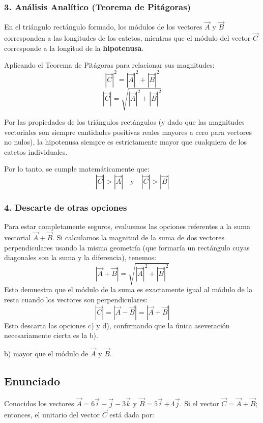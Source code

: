 \documentclass[12pt, a4paper]{article}
\begin{document}
\subsubsection*{3. Análisis Analítico (Teorema de Pitágoras)}
En el triángulo rectángulo formado, los módulos de los vectores $\vec{A}$ y $\vec{B}$ corresponden a las longitudes de los catetos, mientras que el módulo del vector $\vec{C}$ corresponde a la longitud de la \textbf{hipotenusa}.

Aplicando el Teorema de Pitágoras para relacionar sus magnitudes:
$$|\vec{C}|^2 = |\vec{A}|^2 + |\vec{B}|^2$$
$$|\vec{C}| = \sqrt{|\vec{A}|^2 + |\vec{B}|^2}$$

Por las propiedades de los triángulos rectángulos (y dado que las magnitudes vectoriales son siempre cantidades positivas reales mayores a cero para vectores no nulos), la hipotenusa siempre es estrictamente mayor que cualquiera de los catetos individuales.

Por lo tanto, se cumple matemáticamente que:
$$|\vec{C}| > |\vec{A}| \quad \text{y} \quad |\vec{C}| > |\vec{B}|$$

\subsubsection*{4. Descarte de otras opciones}
Para estar completamente seguros, evaluemos las opciones referentes a la suma vectorial $\vec{A} + \vec{B}$.
Si calculamos la magnitud de la suma de dos vectores perpendiculares usando la misma geometría (que formaría un rectángulo cuyas diagonales son la suma y la diferencia), tenemos:
$$|\vec{A} + \vec{B}| = \sqrt{|\vec{A}|^2 + |\vec{B}|^2}$$
Esto demuestra que el módulo de la suma es exactamente igual al módulo de la resta cuando los vectores son perpendiculares:
$$|\vec{C}| = |\vec{A} - \vec{B}| = |\vec{A} + \vec{B}|$$
Esto descarta las opciones c) y d), confirmando que la única aseveración necesariamente cierta es la b).

\begin{tcolorbox}[colback=green!5!white, colframe=green!50!black, title=Respuesta Final]
\centering \Large b) mayor que el módulo de $\vec{A}$ y $\vec{B}$.
\end{tcolorbox}

\newpage

\subsection*{Enunciado}
Conocidos los vectores $\vec{A} = 6\vec{i} - \vec{j} - 3\vec{k}$ y $\vec{B} = 5\vec{i} + 4\vec{j}$. Si el vector $\vec{C} = \vec{A} + \vec{B}$; entonces, el unitario del vector $\vec{C}$ está dada por:
\end{document}
